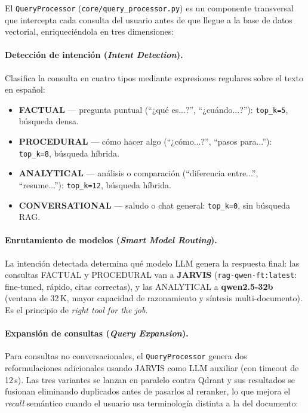 El \texttt{QueryProcessor} (\texttt{core/query\_processor.py}) es un componente transversal que intercepta cada consulta del usuario antes de que llegue a la base de datos vectorial, enriqueciéndola en tres dimensiones:

\paragraph{Detección de intención (\textit{Intent Detection}).}
Clasifica la consulta en cuatro tipos mediante expresiones regulares sobre el texto en español:
\begin{itemize}
    \item \textbf{FACTUAL} --- pregunta puntual (``¿qué es...?'', ``¿cuándo...?''): \texttt{top\_k=5}, búsqueda densa.
    \item \textbf{PROCEDURAL} --- cómo hacer algo (``¿cómo...?'', ``pasos para...''): \texttt{top\_k=8}, búsqueda híbrida.
    \item \textbf{ANALYTICAL} --- análisis o comparación (``diferencia entre...'', ``resume...''): \texttt{top\_k=12}, búsqueda híbrida.
    \item \textbf{CONVERSATIONAL} --- saludo o chat general: \texttt{top\_k=0}, sin búsqueda RAG.
\end{itemize}

\paragraph{Enrutamiento de modelos (\textit{Smart Model Routing}).}
La intención detectada determina qué modelo LLM genera la respuesta final: las consultas FACTUAL y PROCEDURAL van a \textbf{JARVIS} (\texttt{rag-qwen-ft:latest}: fine-tuned, rápido, citas correctas), y las ANALYTICAL a \textbf{qwen2.5-32b} (ventana de 32\,K, mayor capacidad de razonamiento y síntesis multi-documento). Es el principio de \textit{right tool for the job}.

\paragraph{Expansión de consultas (\textit{Query Expansion}).}
Para consultas no conversacionales, el \texttt{QueryProcessor} genera dos reformulaciones adicionales usando JARVIS como LLM auxiliar (con timeout de 12\,s). Las tres variantes se lanzan en paralelo contra Qdrant y sus resultados se fusionan eliminando duplicados antes de pasarlos al reranker, lo que mejora el \textit{recall} semántico cuando el usuario usa terminología distinta a la del documento:


